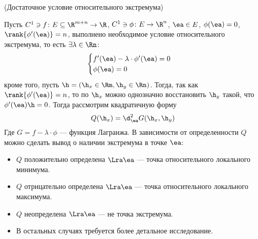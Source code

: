 \begin{theorem}(Достаточное условие относительного экстремума)

    Пусть $C^1 \ni f \colon E \subseteq \R^{m + n} \to \R$, $C^1 \ni \phi \colon
    E \to \R^n$, $\ea \in E$, $\phi(\ea) = 0$, $\rank{\phi'(\ea)} = n$,
    выполнено необходимое условие относительного экстремума, то есть $\exists
    \lambda \in \Rn \colon$
 \[
     \begin{cases}
         f'(\ea) - \lambda \cdot \phi'(\ea) = 0 \\
         \phi(\ea) = 0
     \end{cases}
 \]
    кроме того, пусть $\h = (\h_x \in \Rm, \h_y \in \Rn)$. Тогда, так как
    $\rank{\phi'(\ea)} = n$, то по $\h_x$ можно однозначно восстановить $\h_y$ такой,
    что $\phi'(\ea)\h = 0$. Тогда рассмотрим квадратичную форму
\[
    Q(\h_x) = \d^2_{\ea}{G(\h_x, \h_y)}
\]
    Где $G = f - \lambda \cdot \phi$ --- функция Лагранжа. В зависимости от
    определенности $Q$ можно сделать вывод о наличии экстремума в точке $\ea$:
    \begin{itemize}
        \item $Q$ положительно определена $\Lra \ea$ --- точка относительного
        локального минимума.
        \item $Q$ отрицательно определена $\Lra \ea$ --- точка относительного
        локального максимума.
        \item $Q$ неопределена $\Lra \ea$ --- не точка экстремума.
        \item В остальных случаях требуется более детальное исследование.
    \end{itemize}
\end{theorem}

